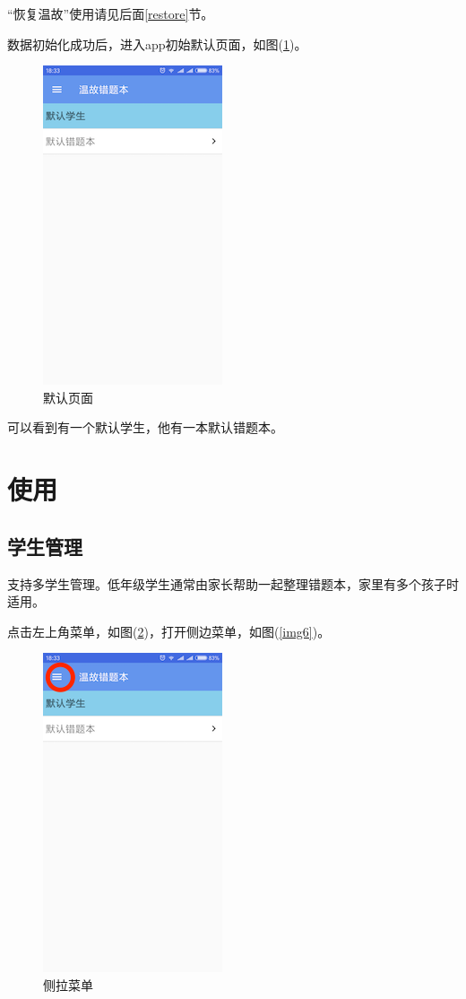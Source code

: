 “恢复温故”使用请见后面\ref{restore}节。

数据初始化成功后，进入app初始默认页面，如图(\ref{img4})。
\begin{figure}[H]
	\centering
	\includegraphics{img/4.png}
	\caption{默认页面}
	\label{img4}
\end{figure}

可以看到有一个默认学生，他有一本默认错题本。

\section{使用}
\subsection{学生管理}
支持多学生管理。低年级学生通常由家长帮助一起整理错题本，家里有多个孩子时适用。

点击左上角菜单，如图(\ref{img5})，打开侧边菜单，如图(\ref{img6})。
\begin{figure}[H]
	\centering
	\includegraphics{img/5.png}
	\caption{侧拉菜单}
	\label{img5}
\end{figure}

